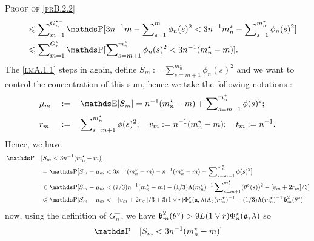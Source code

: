 \begin{pro}{\textsc{Proof of \textsc{\cref{prB.2.2}}} \\}
\begin{alignat*}{2}
& && \leq \sum\nolimits_{m = 1}^{G_{n}^{\star-}} \P [3 n^{-1}m - \sum\nolimits_{s= 1}^{m} \phi_{n}(s)^{2} < 3 n^{-1}m_{n}^{\star} - \sum\nolimits_{s= 1}^{m_{n}^{\star}} \phi_{n}(s)^{2}]\\
& && \leq \sum\nolimits_{m = 1}^{G_{n}^{\star-}} \P[\sum\nolimits_{s= m + 1}^{m_{n}^{\star}} \phi_{n}(s)^{2} < 3 n^{-1}(m_{n}^{\star} - m) ].
\end{alignat*}
The \textsc{\cref{lmA.1.1}} steps in again, define $S_{m} := \sum\nolimits_{s= m + 1}^{m_{n}^{\star}} \phi_{n}(s)^{2}$ and we want to control the concentration of this sum, hence we take the following notations :
\begin{alignat*}{3}
& \mu_{m} && := && \E[S_{m}] = n^{-1} (m_{n}^{\star} - m) + \sum\nolimits_{s= m+1}^{m_{n}^{\star}}\phi(s)^{2};\\
& r_{m} && := && \sum\nolimits_{s= m+1}^{m_{n}^{\star}}\phi(s)^{2}; \quad v_{m} := n^{-1} (m_{n}^{\star} - m); \quad t_{m} := n^{-1}.
\end{alignat*}
Hence, we have
\begin{alignat*}{2}
& \P && [S_{m} < 3 n^{-1} (m_{n}^{\star} - m) ] \\
& && = \P[S_{m} - \mu_{m} < 3 n^{-1} (m_{n}^{\star} - m) - n^{-1} (m_{n}^{\star} - m) - \sum\nolimits_{s= m+1}^{m_{n}^{\star}}\phi(s)^{2}]\\
& && \leq \P[S_{m} - \mu_{m} < (7/3) n^{-1}(m_{n}^{\star} - m) - (1/3) \Lambda(m_{n}^{\star})^{-1}\sum\nolimits_{s= m+1}^{m_{n}^{\star}}(\theta^{\circ}(s))^{2} - [v_{m} + 2 r_{m}]/3]\\
& && \leq \P[S_{m} - \mu_{m} < - [v_{m} + 2 r_{m}]/3 + 3 (1 \vee r) \Phi_{n}^{\star}(\mathfrak{a}, \lambda) \Lambda_{\circ}(m_{n}^{\star})^{-1} - (1/3) \Lambda(m_{n}^{\star})^{-1}\b_{m}^{2}(\theta^{\circ})]
\end{alignat*}
now, using the definition of $G_{n}^{-}$, we have $\operatorname{\mathfrak{b}}_{m}^{2}(\theta^{\circ}) > 9 L (1 \vee r)\Phi_{n}^{\star}(\mathfrak{a}, \lambda)$ so
\begin{alignat*}{2}
& \P&&[S_{m} < 3 n^{-1}(m_{n}^{\star} - m) ]\\

\end{alignat*}
\end{pro}
